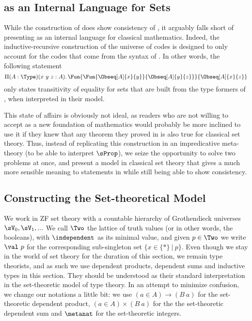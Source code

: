 \subsection{\SetoidCC as an Internal Language for Sets}

While the construction of  does show consistency of
\SetoidCC, it arguably falls short of presenting \SetoidCC as an internal
language for classical mathematics.
%
Indeed, the inductive-recursive construction of the universe of codes is
designed to only account for the codes that come from the syntax of
\SetoidCC. In other words, the following statement
\[
\Pi(A : \Type)(x\ y\ z : A).\,\Fun{\Fun{\Obseq[A]{x}{y}}{\Obseq[A]{y}{z}}}{\Obseq[A]{x}{z}}
\]
only states transitivity of equality for sets that are built from
the type formers of \SetoidCC, when interpreted in their model.

This state of affairs is obviously not ideal, as readers who are not
willing to accept \SetoidCC as a new foundation of mathematics would
probably be more inclined to use it if they knew that any theorem they
proved in \SetoidCC is also true for classical set theory.
%
Thus, instead of replicating this construction in an impredicative
meta-theory (to be able to interpret \( \sProp \)), we seize the
opportunity to solve two problems at once, and present a model in classical
set theory that gives a much more sensible meaning to statements in \SetoidCC
while still being able to show consistency.

\subsection{Constructing the Set-theoretical Model}

We work in ZF set theory with a countable hierarchy of Grothendieck universes
\( \sV_0, \sV_1, ... \)
%
We call \( \Two \) the lattice of truth values (or in other words, the
booleans), with \( \independent \) as its minimal value,
and given \( p \in \Two \) we write \( \val\ p \) for the
corresponding sub-singleton set \( \{ x \in \{ * \}\ |\ p \} \).
%
Even though we stay in the world of set theory for the duration of
this section, we remain type theorists, and as such
we use dependent products, dependent sums and inductive types in this
section. They should be understood as their standard interpretation in
the set-theoretic model of type theory.
%
In an attempt to minimize confusion, we change our notations a little
bit: we use \( (a \in A) \to (B\ a) \) for the set-theoretic dependent product,
\( (a \in A) \times (B\ a) \) for the the set-theoretic dependent sum and
\( \metanat \) for the set-theoretic integers.

